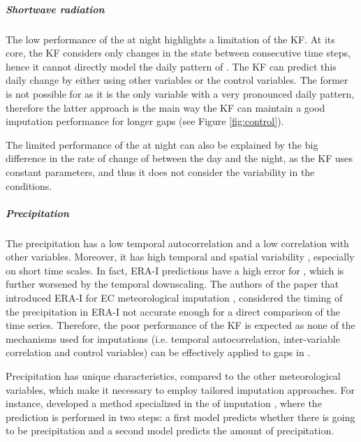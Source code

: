 \documentclass{article}
\begin{document}
\subparagraph{Shortwave radiation} The low performance of the  at night highlights a limitation of the KF.  At its core, the KF considers only changes in the state between consecutive time steps, hence it cannot directly model the daily pattern of . The KF can predict this daily change by either using other variables or the control variables. The former is not possible for  as it is the only variable with a very pronounced daily pattern, therefore the latter approach is the main way the KF can maintain a good imputation performance for longer gaps (see Figure \ref{fig:control}).

The limited performance of the  at night can also be explained by the big difference in the rate of change of  between the day and the night, as the KF uses constant parameters, and thus it does not consider the variability in the  conditions.

\subparagraph{Precipitation} The precipitation has a low temporal autocorrelation and a low correlation with other variables. Moreover, it has high temporal and spatial variability \cite{mital_sequential_2020}, especially on short time scales. In fact, ERA-I predictions have a high error for , which is further worsened by the temporal downscaling. The authors of the paper that introduced ERA-I for EC meteorological imputation \cite{vuichard_filling_2015}, considered the timing of the precipitation in ERA-I not accurate enough for a direct comparison of the time series.
Therefore, the poor performance of the KF is expected as none of the mechanisms used for imputations (i.e. temporal autocorrelation, inter-variable correlation and control variables) can be effectively applied to gaps in . 

Precipitation has unique characteristics, compared to the other meteorological variables, which make it necessary to employ tailored imputation approaches. For instance, \textcite{chivers_imputation_2020} developed a method specialized in the of imputation , where the prediction is performed in two steps: a first model predicts whether there is going to be precipitation and a second model predicts the amount of precipitation.
\end{document}
